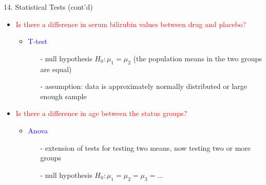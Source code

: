 \documentclass[14pt, aspectratio=169, sectionpage=simple, xclolor=table]{beamer}
\begin{document}
\begin{frame}[fragile]{14. Statistical Tests  (cont'd)}
\begin{itemize}
\item \textcolor{red}{Is there a difference in serum bilirubin values between drug and placebo?}
\begin{itemize}
\item \textcolor{blue}{T-test}
\begin{itemize}
	\item[-] null hypothesis $H_0 : \mu_1 = \mu_2$ (the population means in the two groups are equal)
	\item[-] assumption: data is approximately normally distributed or large enough sample
\end{itemize}
\end{itemize}
\item \textcolor{red}{Is there a difference in age between the status groups?}
\begin{itemize}
\item \textcolor{blue}{Anova}
\begin{itemize}
	\item[-] extension of tests for testing two means, now testing two or more groups
	\item[-] null hypothesis $H_0 : \mu_1 = \mu_2 = \mu_3 = \dots$
\end{itemize}
\end{itemize}
\end{itemize}
\end{frame}
\end{document}
